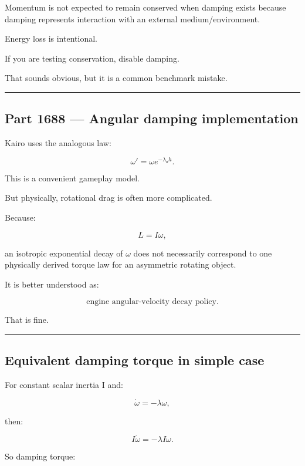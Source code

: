 Momentum is not expected to remain conserved when damping exists because damping represents interaction with an external medium/environment.

Energy loss is intentional.

If you are testing conservation, disable damping.

That sounds obvious, but it is a common benchmark mistake.

\begin{center}\rule{0.5\linewidth}{0.5pt}\end{center}

\subsection{Part 1688 --- Angular damping implementation}\label{06-engine-ii-ch039-part-1688-angular-damping-implementation}

Kairo uses the analogous law:

\[
\boxed{
\omega'
=
\omega e^{-\lambda_ah}.
}
\]

This is a convenient gameplay model.

But physically, rotational drag is often more complicated.

Because:

\[
L=I\omega,
\]

an isotropic exponential decay of \(\omega\) does not necessarily correspond to one physically derived torque law for an asymmetric rotating object.

It is better understood as:

\[
\boxed{
\text{engine angular-velocity decay policy}.
}
\]

That is fine.

\begin{center}\rule{0.5\linewidth}{0.5pt}\end{center}

\subsection{Equivalent damping torque in simple case}\label{06-engine-ii-ch039-equivalent-damping-torque-in-simple-case}

For constant scalar inertia I and:

\[
\dot\omega=-\lambda\omega,
\]

then:

\[
I\dot\omega
=
-\lambda I\omega.
\]

So damping torque:

